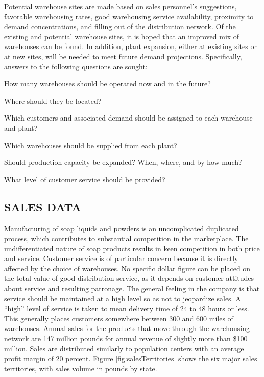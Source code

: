 \documentclass[12pt,a4paper]{article}
\begin{document}
Potential warehouse sites are made based on sales personnel's suggestions, favorable warehousing rates, good warehousing service availability, proximity to demand concentrations, and filling out of the distribution network.
Of the existing and potential warehouse sites, it is hoped that an improved mix of warehouses can be found.
In addition, plant expansion, either at existing sites or at new sites, will be needed to meet future demand projections.
Specifically, answers to the following questions are sought:

\begin{enumerate}
    \begin{singlespace}
        \item How many warehouses should be operated now and in the future?
        \item Where should they be located?
        \item Which customers and associated demand should be assigned to each warehouse and plant?
        \item Which warehouses should be supplied from each plant?
        \item Should production capacity be expanded? When, where, and by how much?
        \item What level of customer service should be provided?
    \end{singlespace}
\end{enumerate}

\subsection{SALES DATA}

Manufacturing of soap liquids and powders is an uncomplicated duplicated process, which contributes to substantial competition in the marketplace.
The undifferentiated nature of soap products results in keen competition in both price and service.
Customer service is of particular concern because it is directly affected by the choice of warehouses.
No specific dollar figure can be placed on the total value of good distribution service, as it depends on customer attitudes about service and resulting patronage.
The general feeling in the company is that service should be maintained at a high level so as not to jeopardize sales.
A ``high'' level of service is taken to mean delivery time of 24 to 48 hours or less.
This generally places customers somewhere between 300 and 600 miles of warehouses.
Annual sales for the products that move through the warehousing network are 147 million pounds for annual revenue of slightly more than \$100 million.
Sales are distributed similarly to population centers with an average profit margin of 20 percent.
Figure \ref{fig:salesTerritories} shows the six major sales territories, with sales volume in pounds by state.
\end{document}

